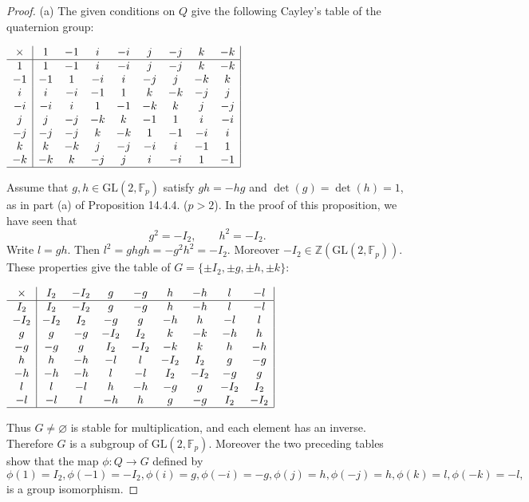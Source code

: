 \documentclass[11pt,a4paper]{article}
\newcommand{\Z}{\mathbb{Z}}
\newcommand{\F}{\mathbb{F}}
\begin{document}
{{}
\begin{proof}
\item[(a)] The given conditions on $Q$ give the following Cayley's table of the quaternion group:
\begin{center}
$
\begin{array}{c|cccccccc|}
  \times &1  &-1 &i &-i &j &-j &k &-k   \\
  \hline
         1 &1  &-1 &i &-i &j &-j &k &-k    \\
   	-1 &-1  &1 &-i &i &-j &j &-k &k    \\
	i &i  &-i  &-1 &1 &k &-k &-j & j   \\
	-i &-i  &i &1 &-1 &-k &k &j &-j    \\
	j &j  &-j &-k &k &-1 &1 &i &-i    \\
	-j &-j  &-j &k&-k &1 &-1&-i &i    \\
	k &k  &-k &j &-j &-i &i &-1 &1    \\
	-k &-k  &k &-j &j &i &-i &1 &-1    \\
	\hline
\end{array}
$
\end{center}
Assume that $g,h \in \mathrm{GL}(2,\F_p)$ satisfy $gh = -hg$ and $\det(g) = \det(h) = 1$, as in part (a) of Proposition 14.4.4. ($p>2$). In the proof of this proposition, we have seen that
$$g^2 = -I_2,\qquad h^2 = -I_2.$$ 
Write $l = gh$. Then $l^2 = ghgh = -g^2h^2= -I_2$. Moreover $-I_2 \in \Z(\mathrm{GL}(2,\F_p))$. These properties give the table of $G = \{\pm I_2,\pm g, \pm h, \pm k\}$: 
\begin{center}
$
\begin{array}{c|cccccccc|}
  \times &I_2  &-I_2 & g &-g &h &-h &l &-l   \\
  \hline
         I_2 &I_2  &-I_2 &g &-g &h &-h &l &-l    \\
   	-I_2 &-I_2  &I_2 &-g &g&-h &h &-l &l    \\
	g&g  &-g  &-I_2 &I_2 &k &-k &-h & h   \\
	-g &-g  &g &I_2 &-I_2 &-k &k &h&-h    \\
	h &h  &-h &-l &l &-I_2 &I_2&g &-g    \\
	-h &-h  &-h &l&-l &I_2 &-I_2&-g &g    \\
	l &l  &-l &h &-h &-g &g &-I_2 &I_2    \\
	-l &-l  &l &-h &h&g &-g &I_2 &-I_2    \\
	\hline
\end{array}
$
\end{center}
Thus $G\ne \varnothing$ is stable for multiplication, and each element has an inverse. Therefore $G$ is a subgroup of $\mathrm{GL}(2,\F_p)$. Moreover the two preceding tables show that the map $\phi : Q \to G$ defined by $$\phi(1) = I_2, \phi(-1) = -I_2, \phi(i) = g, \phi(-i) = -g, \phi(j) = h, \phi(-j) = h, \phi(k) = l, \phi(-k) = -l,$$ is a group isomorphism.


\end{proof}}
\end{document}
